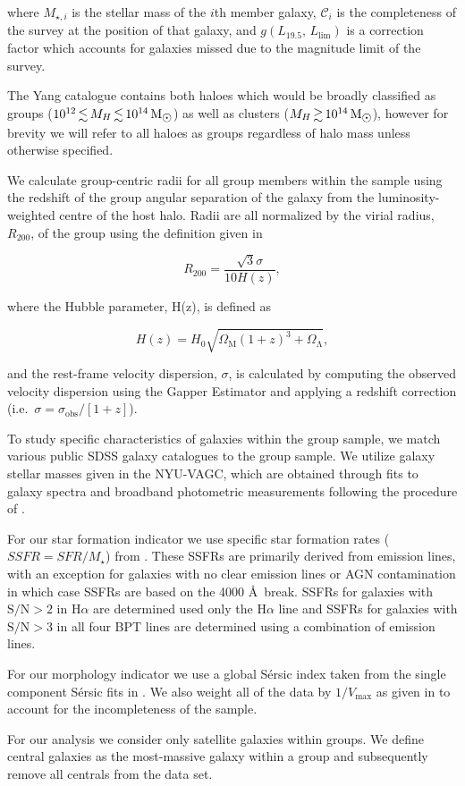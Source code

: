 \documentclass[a4paper,fleqn,usenatbib]{mnras}
\newcommand{\Msun}{\,\mathrm{M_{\sun}}}
\begin{document}
\noindent
where $M_{\star,i}$ is the stellar mass of the $i$th member galaxy,
$\mathcal{C}_i$ is the completeness of the survey at the position of
that galaxy, and $g(L_{19.5},\,L_{\text{lim}})$ is a correction factor
which accounts for galaxies missed due to the magnitude limit of the
survey.
\par
The Yang catalogue contains both haloes which would be broadly classified as
groups ($10^{12} \la M_H \la 10^{14}\Msun$) as well as clusters ($M_H
\ga 10^{14}\Msun$), however for brevity we will refer to all haloes as
groups regardless of halo mass unless otherwise specified.
\par
We calculate group-centric radii for all group members within the
sample using the redshift of the group angular separation of the galaxy from the
luminosity-weighted centre of the host halo.  Radii are
all normalized by the virial radius, $R_{200}$, of the group using the
definition given in \citet{carlberg1997}

\begin{equation}
  R_{200} = \frac{\sqrt{3} \sigma}{10 H(z)},
\end{equation}

\noindent
where the Hubble parameter, H(z), is defined as

\begin{equation}
  H(z) = H_0 \sqrt{\Omega_\mathrm{M} (1+z)^3 +
    \Omega_\mathrm{\Lambda}},
\end{equation}

\noindent
and the rest-frame velocity dispersion, $\sigma$, is calculated by
computing the observed velocity dispersion using the Gapper Estimator
\citep{beers1990} and applying a redshift correction (i.e.\ $\sigma = \sigma_\mathrm{obs}/[1+z]$).
\par
To study specific characteristics of galaxies within the group
sample, we match various public SDSS galaxy catalogues to the group
sample.  We utilize galaxy stellar masses given in the NYU-VAGC, which
are obtained through fits to galaxy spectra and broadband photometric
measurements following the procedure of \citet{blanton2007}.
\par
For our star formation indicator we use specific star formation rates
($SSFR = SFR/M_\star$) from \citet{brinchmann2004}.  These SSFRs are
primarily derived from emission lines, with an exception for galaxies
with no clear emission lines or AGN contamination in which case SSFRs
are based on the 4000 \AA\ break.  SSFRs for galaxies with $\text{S/N}
> 2$ in H$\alpha$ are determined used only the H$\alpha$ line and
SSFRs for galaxies with $\text{S/N} > 3$ in all four BPT lines are
determined using a combination of emission lines.
\par
For our morphology indicator we use a global S\'{e}rsic
index taken from the single component S\'{e}rsic fits in
\citet{simard2011}.  We also weight all of the data by
$1/V_\text{max}$ as given in \citet{simard2011} to account for the
incompleteness of the sample.
\par
For our analysis we consider only satellite galaxies within groups.
We define central galaxies as the most-massive galaxy within a group
and subsequently remove all centrals from the data set.
\end{document}
